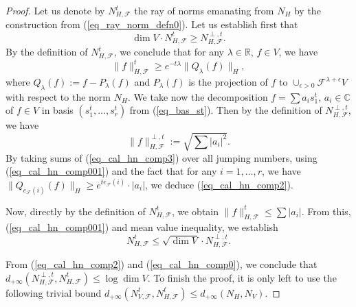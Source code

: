 \documentclass[12pt]{article}
\numberwithin{equation}{section}
\theoremstyle{theorem}
\theoremstyle{definition}
\theoremstyle{remark}
\newcommand{\comp}{\mathbb{C}}
\newcommand{\real}{\mathbb{R}}
\begin{document}
	\begin{proof}
		Let us denote by $N_{H, \mathcal{F}}^{t}$ the ray of norms emanating from $N_H$ by the construction from (\ref{eq_ray_norm_defn0}).
		Let us establish first that
		\begin{equation}\label{eq_cal_hn_comp2}
			\dim V \cdot N_{H, \mathcal{F}}^{t} \geq  N_{H, \mathcal{F}}^{\perp, t}.
		\end{equation}
		By the definition of $N_{H, \mathcal{F}}^{t}$, we conclude that for any $\lambda \in \real$, $f \in V$, we have
		\begin{equation}\label{eq_cal_hn_comp3}
			\| f \|_{H, \mathcal{F}}^{t}  \geq e^{-t \lambda} \| Q_{\lambda}(f) \|_H,
		\end{equation}
		where $Q_{\lambda}(f) := f - P_{\lambda}(f)$ and $P_{\lambda}(f)$ is the projection of $f$ to $\cup_{\epsilon > 0} \mathcal{F}^{\lambda + \epsilon} V$ with respect to the norm $N_H$.
		We take now the decomposition $f = \sum a_i s_1^t$, $a_i \in \comp$ of $f \in V$ in basis $(s_1^t, \ldots, s_r^t)$ from (\ref{eq_bas_st}).
		Then by the definition of $N_{H, \mathcal{F}}^{\perp, t}$, we have
		\begin{equation}\label{eq_cal_hn_comp001}
			\| f \|_{H, \mathcal{F}}^{\perp, t}  := \sqrt{ \sum |a_i|^2}.
		\end{equation}
		By taking sums of (\ref{eq_cal_hn_comp3}) over all jumping numbers, using (\ref{eq_cal_hn_comp001}) and the fact that for any $i = 1, \ldots, r$, we have
		$ \| Q_{e_{\mathcal{F}}(i)}(f) \|_H
		\geq
		e^{t e_{\mathcal{F}}(i)} \cdot |a_i|$, we deduce (\ref{eq_cal_hn_comp2}).
		\par 
		Now, directly by the definition of $N_{H, \mathcal{F}}^{t}$, we obtain
		$
			\| f \|_{H, \mathcal{F}}^{t} \leq  \sum |a_i|
		$.
		From this, (\ref{eq_cal_hn_comp001}) and mean value inequality, we establish
		\begin{equation}\label{eq_cal_hn_comp0}
			N_{H, \mathcal{F}}^{t} \leq \sqrt{\dim V} \cdot  N_{H, \mathcal{F}}^{\perp, t}.
		\end{equation}
		\par 
		From (\ref{eq_cal_hn_comp2}) and (\ref{eq_cal_hn_comp0}), we conclude that 
		$
			d_{+ \infty}(N_{H, \mathcal{F}}^{\perp, t}, N_{H, \mathcal{F}}^t)
			\leq
			\log \dim V
		$.
		To finish the proof, it is only left to use the following trivial bound
		$
			d_{+ \infty}(N_{V, \mathcal{F}}^t, N_{H, \mathcal{F}}^t)
			\leq
			d_{+ \infty}(N_H, N_V)
		$.
	\end{proof}
	\par 
\end{document}
